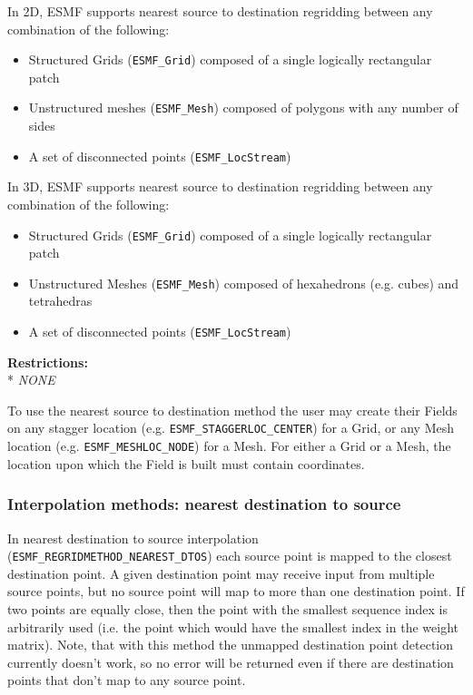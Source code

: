 \smallskip

 In 2D, ESMF supports nearest source to destination regridding between any combination of the following:
 \begin{itemize}
 \item Structured Grids ({\tt ESMF\_Grid}) composed of a single logically rectangular patch
 \item Unstructured meshes ({\tt ESMF\_Mesh}) composed of polygons with any number of sides
 \item A set of disconnected points ({\tt ESMF\_LocStream}) 
 \end{itemize}

\smallskip

 In 3D, ESMF supports nearest source to destination regridding between any combination of the following:
 \begin{itemize}
 \item Structured Grids ({\tt ESMF\_Grid}) composed of a single logically rectangular patch
 \item Unstructured Meshes ({\tt ESMF\_Mesh}) composed of hexahedrons (e.g. cubes) and tetrahedras
 \item A set of disconnected points ({\tt ESMF\_LocStream}) 
 \end{itemize}

\smallskip

\textbf{Restrictions:}\\*
\textit{NONE}

\smallskip

 To use the nearest source to destination method the user may create their Fields on any stagger location (e.g. {\tt ESMF\_STAGGERLOC\_CENTER}) for a Grid, or
 any Mesh location (e.g. {\tt ESMF\_MESHLOC\_NODE}) for a Mesh. For either a Grid or a Mesh, the location upon which the Field is built 
 must contain coordinates. 


\subsubsection{Interpolation methods: nearest destination to source}\label{sec:interpolation:nearestdtos}
In nearest destination to source interpolation ({\tt ESMF\_REGRIDMETHOD\_NEAREST\_DTOS}) each source point is mapped to the closest destination point. A given destination point may receive input from multiple source points, but no source point will map to more than one destination point. If two points are equally close, then the point with the smallest sequence index is arbitrarily used (i.e. the point which would have the smallest index in the weight matrix). Note, that with this method the unmapped destination point detection currently doesn't work, so no error will be returned even if there are destination points that don't map to any source point. 

